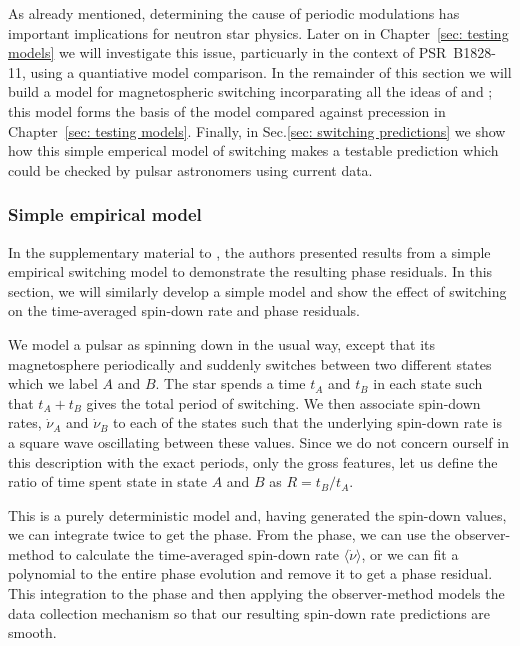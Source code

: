 As already mentioned, determining the cause of periodic modulations has
important implications for neutron star physics. Later on in Chapter~\ref{sec:
testing models} we will investigate this issue, particuarly in the context of
PSR~B1828-11, using a quantiative model comparison. In the remainder of this
section we will build a model for magnetospheric switching incorparating all
the ideas of \citet{Lyne2010} and \citet{Perera2014}; this model forms the basis
of the model compared against precession in Chapter~\ref{sec: testing models}.
Finally, in Sec.\ref{sec: switching predictions} we show how this simple
emperical model of switching makes a testable prediction which could be
checked by pulsar astronomers using current data.

\subsubsection{Simple empirical model}

In the supplementary material to \citet{Lyne2010}, the authors presented
results from a simple empirical switching model to demonstrate the resulting
phase residuals. In this section, we will similarly develop a simple model and
show the effect of switching on the time-averaged spin-down rate and phase
residuals.

We model a pulsar as spinning down in the usual way, except that its
magnetosphere periodically and suddenly switches between two different states which
we label $A$ and $B$. The star spends a time $t_A$ and $t_B$ in each state such
that $t_A+t_B$ gives the total period of switching. We then associate spin-down
rates, $\dot{\nu}_{A}$ and $\dot{\nu}_{B}$ to each of the states such that the
underlying spin-down rate is a square wave oscillating between these values.
Since we do not concern ourself in this description with the exact periods,
only the gross features, let us define the ratio of time spent state in state
$A$ and $B$ as $R = t_{B}/t_{A}$.

This is a purely deterministic model and, having generated the spin-down
values, we can integrate twice to get the phase. From the phase, we can use the
observer-method to calculate the time-averaged spin-down rate
$\langle\dot{\nu}\rangle$, or we can fit a polynomial to the entire phase
evolution and remove it to get a phase residual. This integration to the phase
and then applying the observer-method models the data collection mechanism so
that our resulting spin-down rate predictions are smooth.

